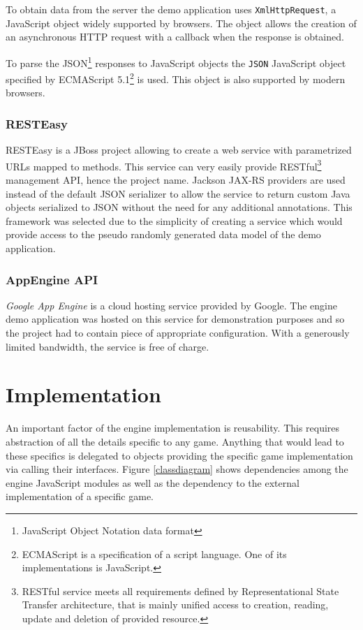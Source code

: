 \documentclass[11pt,oneside, final]{fithesis2}
\begin{document}
To obtain data from the server the demo application uses \texttt{XmlHttpRequest}, a JavaScript object widely supported by browsers\cite{xhr}. The object allows the creation of an asynchronous HTTP request with a callback when the response is obtained.

To parse the JSON\footnote{JavaScript Object Notation data format} responses to JavaScript objects the \texttt{JSON} JavaScript object specified by ECMAScript 5.1\footnote{ECMAScript is a specification of a script language. One of its implementations is JavaScript\cite{ecma}.} is used. This object is also supported by modern browsers\cite{json}.

\subsection{RESTEasy}
RESTEasy is a JBoss project allowing to create a web service with parametrized URLs mapped to methods\cite{resteasy}. This service can very easily  provide RESTful\footnote{RESTful service meets all requirements defined by Representational State Transfer architecture, that is mainly unified access to creation, reading, update and deletion of provided resource\cite{fielding}.} management API, hence the project name. Jackson JAX-RS providers\cite{jackson} are used instead of the default JSON serializer to allow the service to return custom Java objects serialized to JSON without the need for any additional annotations. This framework was selected due to the simplicity of creating a service which would provide access to the pseudo randomly generated data model of the demo application.

\subsection{AppEngine API}
\emph{Google App Engine} is a cloud hosting service provided by Google. The engine demo application was hosted on this service for demonstration purposes and so the project had to contain piece of appropriate configuration. With a generously limited bandwidth, the service is free of charge. \cite{appengine}

\chapter{Implementation}
\label{implementation}
An important factor of the engine implementation is reusability. This requires abstraction of all the details specific to any game. Anything that would lead to these specifics is delegated to objects providing the specific game implementation via calling their interfaces. Figure \ref{classdiagram} shows dependencies among the engine JavaScript modules as well as the dependency to the external implementation of a specific game.
\end{document}
